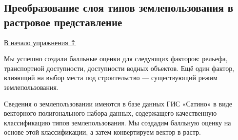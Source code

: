 \documentclass[
  12pt,
]{book}
\begin{document}
\hypertarget{ux43fux440ux435ux43eux431ux440ux430ux437ux43eux432ux430ux43dux438ux435-ux441ux43bux43eux44f-ux442ux438ux43fux43eux432-ux437ux435ux43cux43bux435ux43fux43eux43bux44cux437ux43eux432ux430ux43dux438ux44f-ux432-ux440ux430ux441ux442ux440ux43eux432ux43eux435-ux43fux440ux435ux434ux441ux442ux430ux432ux43bux435ux43dux438ux435}{%
\subsection{Преобразование слоя типов землепользования в растровое представление}\label{ux43fux440ux435ux43eux431ux440ux430ux437ux43eux432ux430ux43dux438ux435-ux441ux43bux43eux44f-ux442ux438ux43fux43eux432-ux437ux435ux43cux43bux435ux43fux43eux43bux44cux437ux43eux432ux430ux43dux438ux44f-ux432-ux440ux430ux441ux442ux440ux43eux432ux43eux435-ux43fux440ux435ux434ux441ux442ux430ux432ux43bux435ux43dux438ux435}}

\protect\hyperlink{weighted-overlay}{В начало упражнения ⇡}

Мы успешно создали балльные оценки для следующих факторов: рельефа, транспортной доступности, доступности водных объектов. Ещё один фактор, влияющий на выбор места под строительство --- существующий режим землепользования.

Сведения о землепользовании имеются в базе данных ГИС «Сатино» в виде векторного полигонального набора данных, содержащего качественную классификацию типов землепользования. Мы создадим балльную оценку на основе этой классификации, а затем конвертируем вектор в растр.
\end{document}
